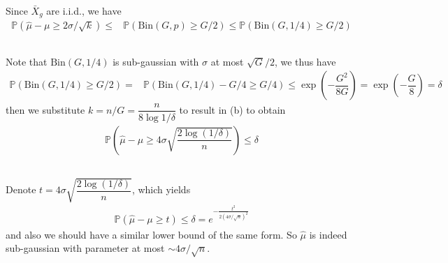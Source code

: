 \documentclass[11pt,a4paper]{article}
\numberwithin{equation}{section}%
\begin{document}
Since $ \bar{X}_g $ are i.i.d., we have
\begin{align*}
    \mathbb{P}\left( \hat{\mu }-\mu \geq 2\sigma /\sqrt{k} \right) \leq & \mathbb{P}\left( \mathrm{Bin}(G,p) \geq G/2 \right)
    \leq  \mathbb{P}\left( \mathrm{Bin}(G,1/4) \geq G/2 \right) 
\end{align*}


\subsection{}
Note that $ \mathrm{ Bin }(G,1/4)  $ is sub-gaussian with $ \sigma  $ at most $ \sqrt{G}/2 $, we thus have
\begin{align*}
    \mathbb{P}\left( \mathrm{Bin}(G,1/4) \geq G/2 \right) =& \mathbb{P}\left( \mathrm{Bin}(G,1/4) -G/4 \geq G/4 \right)
    \leq  \exp\left( -\dfrac{ G^2 }{ 8G } \right)
    = \exp\left( -\dfrac{ G }{ 8 } \right) = \delta 
\end{align*}
then we substitute $ k=n/G = \dfrac{ n  }{ 8\log 1/\delta  }  $ to result in (b) to obtain
\begin{align*}
    \mathbb{P}\left( \hat{\mu } -\mu \geq 4\sigma \sqrt{\dfrac{ 2\log (1/\delta ) }{ n } } \right) \leq \delta  
\end{align*}

\subsection{}
Denote $ t = 4\sigma \sqrt{\dfrac{ 2\log (1/\delta ) }{ n } }  $, which yields
\begin{align*}
    \mathbb{P}\left( \hat{\mu } -\mu \geq t \right) \leq \delta = e^{-\frac{ t^2 }{ 2 (4\sigma /\sqrt{n})^2 } } 
\end{align*}
and also we should have a similar lower bound of the same form. So $ \hat{\mu } $ is indeed sub-gaussian with parameter at most $ \sim 4\sigma /\sqrt{n} $.



\section{}


    
\end{document}

